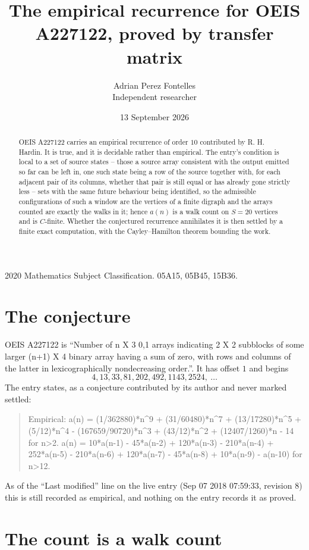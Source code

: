 \documentclass[11pt,a4paper]{article}
\title{The empirical recurrence for OEIS A227122, proved by transfer matrix}
\author{Adrian Perez Fontelles\\ \small Independent researcher}
\date{13 September 2026}
\theoremstyle{plain}
\theoremstyle{definition}
\begin{document}
\maketitle

\begin{abstract}
OEIS A227122 carries an empirical recurrence of order $10$ contributed by R. H. Hardin. It is
true, and it is decidable rather than empirical. The entry's condition is local to a set of source states -- those a source array consistent with the output emitted so far can be left in, one such state being a row of the source together with, for each adjacent pair of its columns, whether that pair is still equal or has already gone strictly less -- sets with the same future behaviour being identified, so
the admissible configurations of such a window are the vertices of a finite digraph and the
arrays counted are exactly the walks in it; hence $a(n)$ is a walk count on $S=20$ vertices
and is $C$-finite. Whether the conjectured recurrence annihilates it is then settled by a
finite exact computation, with the Cayley--Hamilton theorem bounding the work.
\end{abstract}

\noindent\small 2020 Mathematics Subject Classification. 05A15, 05B45, 15B36.\normalsize

\section{The conjecture}

OEIS A227122 is ``Number of n X 3 0,1 arrays indicating 2 X 2 subblocks of some larger (n+1) X 4 binary array having a sum of zero, with rows and columns of the latter in lexicographically nondecreasing order.''. It has offset $1$ and begins
\[
4, 13, 33, 81, 202, 492, 1143, 2524,\ \dots
\]
The entry states, as a conjecture contributed by its author and never marked settled:
\begin{quote}
Empirical: a(n) = (1/362880)*n\^{}9 + (31/60480)*n\^{}7 + (13/17280)*n\^{}5 + (5/12)*n\^{}4 - (167659/90720)*n\^{}3 + (43/12)*n\^{}2 + (12407/1260)*n - 14 for n>2. a(n) = 10*a(n-1) - 45*a(n-2) + 120*a(n-3) - 210*a(n-4) + 252*a(n-5) - 210*a(n-6) + 120*a(n-7) - 45*a(n-8) + 10*a(n-9) - a(n-10) for n>12.
\end{quote}
As of the ``Last modified'' line on the live entry (Sep 07 2018 07:59:33, revision 8) this is still
recorded as empirical, and nothing on the entry records it as proved.

\section{The count is a walk count}
\end{document}

